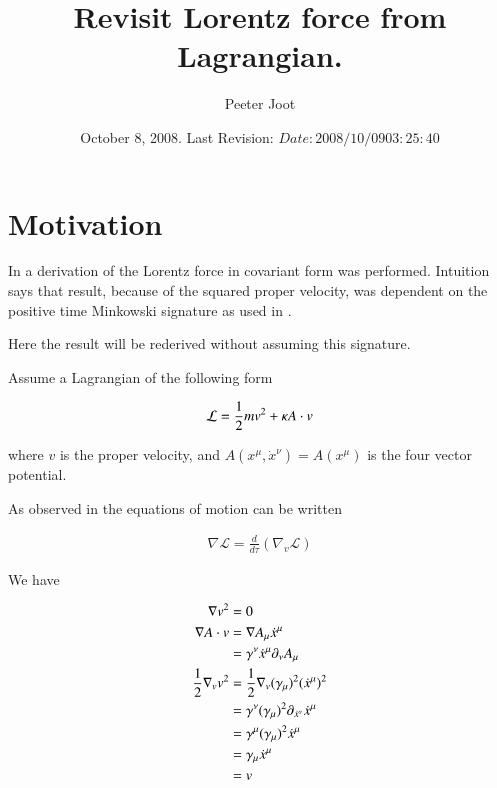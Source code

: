 \documentclass{article}
\title{ Revisit Lorentz force from Lagrangian. }
\author{Peeter Joot}
\date{ October 8, 2008.  Last Revision: $Date: 2008/10/09 03:25:40 $ }
\newcommand{\grad}[0]{\nabla}
\newcommand{\LL}[0]{\mathcal{L}}
\newcommand{\xdot}[0]{\dot{x}}
\begin{document}
\maketitle{}

\tableofcontents

\section{ Motivation }

In \cite{PJSrLagrangian} a derivation of the Lorentz force in covariant
form was performed.  Intuition says that result, because of the squared
proper velocity, was dependent on the 
positive time Minkowski signature as used in \cite{doran2003gap}. 

Here the result will be rederived without assuming this signature.

Assume a Lagrangian of the following form

\begin{align}
\LL = \inv{2}m v^2 + \kappa A \cdot v
\end{align}

where $v$ is the proper velocity, and $A(x^\mu,\xdot^\nu) = A(x^\mu)$ is the four vector potential.

As observed in \cite{PJCanMomentum} the equations of motion can be written

\begin{align}
\grad \LL = \frac{d}{d\tau}(\grad_v \LL)
\end{align}

We have

\begin{align*}
\grad v^2 &= 0 \\
\grad A \cdot v
&= \grad A_\mu \xdot^\mu \\
&= \gamma^\nu \xdot^\mu \partial_\nu A_\mu \\
\inv{2} \grad_v v^2 
&= \inv{2} \grad_v (\gamma_\mu)^2 (\xdot^\mu)^2 \\
&= \gamma^\nu (\gamma_\mu)^2 \partial_{\xdot^\nu} \xdot^\mu \\
&= \gamma^\mu (\gamma_\mu)^2 \xdot^\mu \\
&= \gamma_\mu \xdot^\mu \\
&= v \\
\end{align*}

\end{document}
